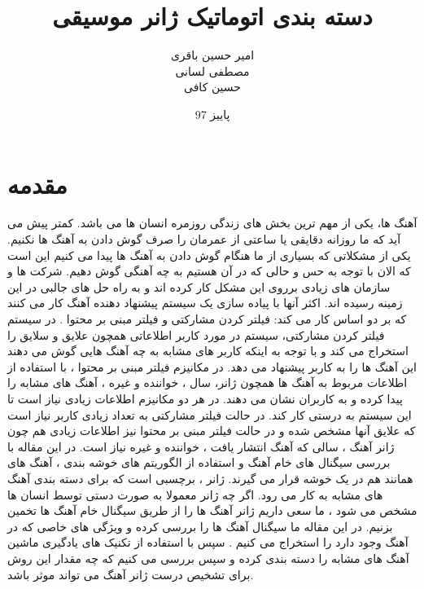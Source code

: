 \documentclass[conference]{IEEEtran}
\title{دسته بندی اتوماتیک ژانر موسیقی   }
\author{
    امیر حسین باقری\\
    مصطفی لسانی\\
    حسین کافی
    }
\date{پاییز 97}
\begin{document}
    \maketitle
    
    
    
    
    
    \section{مقدمه} 
    آهنگ ها، یکی از مهم ترین بخش های زندگی روزمره انسان ها می باشد. کمتر پیش می آید که ما روزانه دقایقی یا ساعتی از عمرمان را صرف گوش دادن به آهنگ ها نکنیم. یکی از مشکلاتی که بسیاری از ما هنگام گوش دادن به آهنگ ها پیدا می کنیم این است که الان با توجه به حس و حالی که در آن هستیم به چه آهنگی گوش دهیم.
    شرکت ها و سازمان های زیادی برروی این مشکل کار کرده اند و به راه حل های جالبی در این زمینه رسیده اند. اکثر آنها با پیاده سازی یک سیستم پیشنهاد دهنده آهنگ کار می کنند که بر دو اساس کار می کند: فیلتر کردن مشارکتی    و  فیلتر مبنی بر محتوا  . در سیستم فیلتر کردن مشارکتی، سیستم در مورد کاربر اطلاعاتی همچون علایق و سلایق را استخراج می کند و با توجه به اینکه کاربر های مشابه به چه آهنگ هایی گوش می دهند این آهنگ ها را به کاربر پیشنهاد می دهد. در مکانیزم فیلتر مبنی بر محتوا ، با استفاده از اطلاعات مربوط به آهنگ ها همچون ژانر، سال ، خواننده و غیره ، آهنگ های مشابه را پیدا کرده و به کاربران نشان می دهند. در هر دو مکانیزم اطلاعات زیادی نیاز است تا این سیستم به درستی کار کند. در حالت فیلتر مشارکتی به تعداد زیادی کاربر نیاز است که علایق آنها مشخص شده و در حالت فیلتر مبنی بر محتوا نیز اطلاعات زیادی هم چون ژانر آهنگ ، سالی که آهنگ انتشار یافت ، خواننده و غیره نیاز است. 
    در این مقاله با بررسی سیگنال های خام آهنگ و استفاده از الگوریتم های خوشه بندی ، آهنگ های همانند هم در یک خوشه قرار می گیرند. 
    ژانر ، برچسبی است که برای دسته بندی آهنگ های مشابه به کار می رود. اگر چه ژانر معمولا به صورت دستی توسط انسان ها مشخص می شود ، ما سعی داریم ژانر آهنگ ها را از طریق سیگنال خام آهنگ ها تخمین بزنیم. در این مقاله ما سیگنال آهنگ ها را بررسی کرده و ویژگی های خاصی که در آهنگ وجود دارد را استخراج می کنیم . سپس با استفاده از تکنیک های یادگیری ماشین آهنگ های مشابه را دسته بندی کرده و سپس بررسی می کنیم که چه مقدار این روش برای تشخیص درست ژانر آهنگ می تواند موثر باشد.
\end{document}
